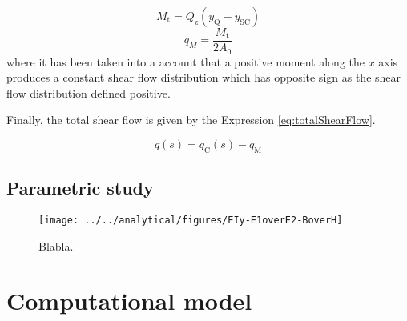 



\begin{equation}\label{eq:momentDueToQz}
  M_\mathrm{t} = Q_\mathrm{z} (y_{\mathrm{Q}} - y_\mathrm{SC})
\end{equation}
%
\begin{equation}\label{eq:constantShearFlow}
  q_M = \frac{M_\mathrm{t}}{2 A_0}
\end{equation}
%
where it has been taken into a account that a positive moment along the $x$ axis produces a constant shear flow distribution which has opposite sign as the shear flow distribution defined positive.

Finally, the total shear flow is given by the Expression \ref{eq:totalShearFlow}.

\begin{equation}\label{eq:totalShearFlow}
  q(s) = q_\mathrm{C}(s) - q_\mathrm{M}
\end{equation}

\subsection{Parametric study} \label{subsec:parametricStudy}

\begin{figure}
  \centering
  \texttt{[image: ../../analytical/figures/EIy-E1overE2-BoverH]}
  \caption[Blabla]{Blabla.}\label{fig:EIy_E1overE2_BoverH}
\end{figure}

\section{Computational model} \label{sec:computationalModel}

% 